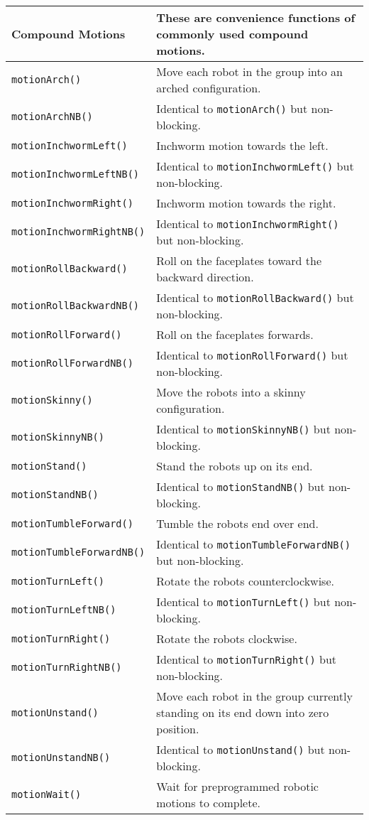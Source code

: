 \begin{tabular}{p{1.75in}p{4.5in}}
Compound Motions & These are convenience functions of commonly used compound motions. \\
\hline
\texttt{motionArch()}  & Move each robot in the group into an arched configuration. \\
\texttt{motionArchNB()}  & Identical to \texttt{motionArch()} but non-blocking. \\
\texttt{motionInchwormLeft()}  & Inchworm motion towards the left. \\
\texttt{motionInchwormLeftNB()}  & Identical to \texttt{motionInchwormLeft()} but non-blocking. \\
\texttt{motionInchwormRight()}  & Inchworm motion towards the right. \\
\texttt{motionInchwormRightNB()}  & Identical to \texttt{motionInchwormRight()} but non-blocking. \\
\texttt{motionRollBackward()}  & Roll on the faceplates toward the backward direction. \\
\texttt{motionRollBackwardNB()}  & Identical to \texttt{motionRollBackward()} but non-blocking. \\
\texttt{motionRollForward()}  & Roll on the faceplates forwards. \\
\texttt{motionRollForwardNB()}  & Identical to \texttt{motionRollForward()} but non-blocking. \\
\texttt{motionSkinny()}  & Move the robots into a skinny configuration. \\
\texttt{motionSkinnyNB()}  & Identical to \texttt{motionSkinnyNB()} but non-blocking. \\
\texttt{motionStand()}  & Stand the robots up on its end. \\
\texttt{motionStandNB()}  & Identical to \texttt{motionStandNB()} but non-blocking. \\
\texttt{motionTumbleForward()}  & Tumble the robots end over end. \\
\texttt{motionTumbleForwardNB()}  & Identical to \texttt{motionTumbleForwardNB()} but non-blocking. \\
\texttt{motionTurnLeft()}  & Rotate the robots counterclockwise. \\
\texttt{motionTurnLeftNB()}  & Identical to \texttt{motionTurnLeft()} but non-blocking. \\
\texttt{motionTurnRight()}  & Rotate the robots clockwise. \\
\texttt{motionTurnRightNB()}  & Identical to \texttt{motionTurnRight()} but non-blocking. \\
\texttt{motionUnstand()}  & Move each robot in the group currently standing on its end down into zero position. \\
\texttt{motionUnstandNB()}  & Identical to \texttt{motionUnstand()} but non-blocking. \\
\texttt{motionWait()}  & Wait for preprogrammed robotic motions to complete. \\
\hline
\end{tabular}
